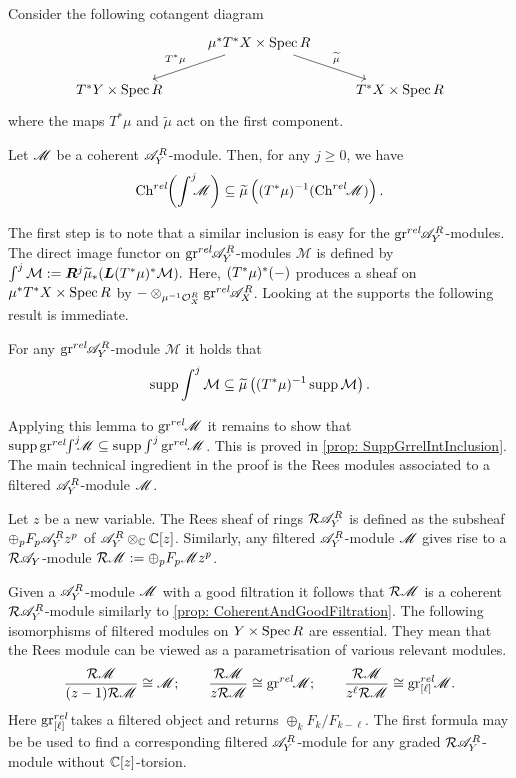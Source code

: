 \noindent
Consider the following cotangent diagram
$$
\begin{tikzcd}
    & \mu^* T^* X\times \Spec R \arrow[swap]{ld}{T^* \mu} \arrow{rd}{\widetilde{\mu}} & \\
    T^* Y\times \Spec R & & T^*X\times \Spec R
\end{tikzcd}
$$
where the maps $T^*\mu$ and $\widetilde{\mu}$ act on the first component.
\begin{theorem}\label{thm: KashiwaraEstimate}
    Let $\mathscr{M}$ be a coherent $\mathscr{A}_Y^R$-module. Then, for any $j\geq 0$, we have
    $$\operatorname{Ch}^{rel}\mkern-5mu\left(\int^j \mkern -8mu \mathscr{M} \right)\subseteq  \widetilde{\mu}\left((T^*\mu)^{-1}(\operatorname{Ch}^{rel}\mkern-5mu \mathscr{M}) \right).$$
\end{theorem}
The first step is to note that a similar inclusion is easy for the $\operatorname{gr}^{rel}\mkern-5mu \mathscr{A}_Y^R$-modules.
The direct image functor on $\operatorname{gr}^{rel}\mkern-5mu \mathscr{A}_Y^R$-modules $\mathcal{M}$ is defined by $\int^j \mathcal{M} :=  \boldsymbol{R}^j \widetilde{\mu}_* ( \boldsymbol{L}(T^*\mu)^*\mathcal{M}).$
Here, $(T^*\mu)^*({-})$ produces a sheaf on $\mu^*T^*X\times \operatorname{Spec} R$ by $ {-}\otimes_{\mu^{-1}\mathcal{O}_X^R} \operatorname{gr}^{rel}\mkern-5mu \mathscr{A}_X^R$.
Looking at the supports the following result is immediate.
\begin{lemma}
    For any $\operatorname{gr}^{rel}\mkern-5mu\mathscr{A}_Y^R$-module $\mathcal{M}$ it holds that
    $$\operatorname{supp} \int^j \mathcal{M}\subseteq \widetilde{\mu}\left((T^* \mu)^{-1} \operatorname{supp} \mathcal{M}\right).$$
\end{lemma}
Applying this lemma to $\operatorname{gr}^{rel}\mkern-5mu\mathscr{M}$ it remains to show that $\operatorname{supp}\operatorname{gr}^{rel}\mkern-5mu\int^j \mkern -8mu\mathscr{M}\subseteq \operatorname{supp}\int^j \operatorname{gr}^{rel}\mkern-5mu\mathscr{M}$. This is proved in \cref{prop: SuppGrrelIntInclusion}. The main technical ingredient in the proof is the Rees modules associated to a filtered $\mathscr{A}_Y^R$-module $\mathscr{M}$.
\begin{definition}
    Let $z$ be a new variable. The Rees sheaf of rings $\mathcal{R}\mathscr{A}_Y^R$ is defined as the subsheaf $\oplus_p F_p \mathscr{A}_Y^R z^p $ of $\mathscr{A}_Y^R \otimes_{\mathbb{C}} \mathbb{C}[z]$. Similarly, any filtered $\mathscr{A}_Y^R$-module $\mathscr{M}$ gives rise to a $\mathcal{R}\mathscr{A}_Y$-module $\mathcal{R}\mathscr{M} := \oplus_p F_p \mathscr{M} z^p$.
\end{definition}
Given a $\mathscr{A}_Y^R$-module $\mathscr{M}$ with a good filtration it follows that $\mathcal{R}\mathscr{M}$ is a coherent $\mathcal{R}\mathscr{A}_Y^R$-module similarly to \cref{prop: CoherentAndGoodFiltration}.
The following isomorphisms of filtered modules on $Y\times \operatorname{Spec} R$ are essential.
They mean that the Rees module can be viewed as a parametrisation of various relevant modules.
$$\frac{\mathcal{R}\mathscr{M}}{(z-1)\mathcal{R}\mathscr{M}} \cong \mathscr{M}; \qquad \frac{\mathcal{R}\mathscr{M}}{z\mathcal{R}\mathscr{M}} \cong \operatorname{gr}^{rel}\mkern-5mu \mathscr{M};\qquad \frac{\mathcal{R}\mathscr{M}}{z^\ell\mathcal{R}\mathscr{M}} \cong  \operatorname{gr}_{[\ell]}^{rel}\mkern-5mu\mathscr{M}.$$
Here $\operatorname{gr}_{[\ell]}^{rel}\mkern-5mu$ takes a filtered object and returns $\oplus_k F_{k}/F_{k-\ell}$.
The first formula may be be used to find a corresponding filtered $\mathscr{A}_Y^R$-module for any graded $\mathcal{R}\mathscr{A}_Y^R$-module without $\mathbb{C}[z]$-torsion.

